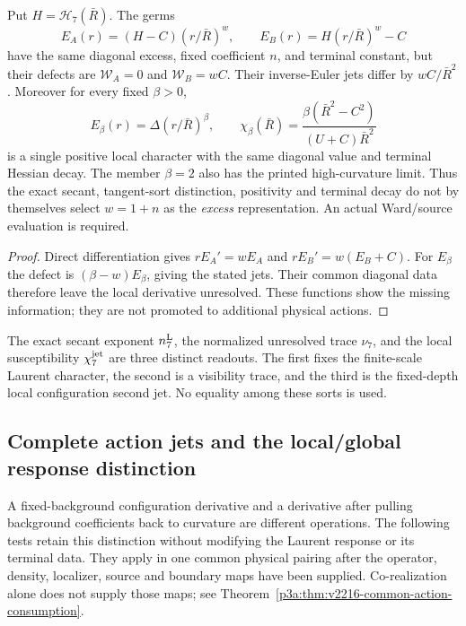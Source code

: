 \documentclass[12pt,a4paper]{article}
\begin{document}
\begin{proposition}
\label{p3d:prop:v2211-excess-jet-counterfamily}
Put $H=\mathscr H_7(\bar R)$. The germs
\[
 E_A(r)=(H-C)(r/\bar R)^w,\qquad
 E_B(r)=H(r/\bar R)^w-C
\]
have the same diagonal excess, fixed coefficient $n$, and terminal constant,
but their defects are $\mathcal W_A=0$ and $\mathcal W_B=wC$.
Their inverse-Euler jets differ by $wC/\bar R^2$.
Moreover for every fixed $\beta>0$,
\[
 E_\beta(r)=\Delta(r/\bar R)^\beta,\qquad
 \chi_\beta(\bar R)=\frac{\beta(\bar R^2-C^2)}{(U+C)\bar R^2}
\]
is a single positive local character with the same diagonal value and
terminal Hessian decay. The member $\beta=2$ also has the printed
high-curvature limit. Thus the exact secant, tangent-sort distinction,
positivity and terminal decay do not by themselves select $w=1+n$ as the
\emph{excess} representation. An actual Ward/source evaluation is required.
\end{proposition}
\begin{proof}
Direct differentiation gives $rE_A'=wE_A$ and
$rE_B'=w(E_B+C)$. For $E_\beta$ the defect is
$(\beta-w)E_\beta$, giving the stated jets. Their common diagonal data
therefore leave the local derivative unresolved. These functions show the
missing information; they are not promoted to additional physical actions.
\end{proof}

\begin{remark}
\label{p3d:rem:v173-three-n7-sorts}
The exact secant exponent $n_7^{\rm L}$, the normalized unresolved trace
$\nu_7$, and the local susceptibility $\chi_7^{\rm jet}$ are three distinct
readouts.  The first fixes the finite-scale Laurent character, the second is
a visibility trace, and the third is the fixed-depth local configuration
second jet.  No equality among these sorts is used.
\end{remark}

\subsection{Complete action jets and the local/global response distinction}
\label{p3d:sec:v2216-complete-action-jets}

A fixed-background configuration derivative and a derivative after pulling
background coefficients back to curvature are different operations. The
following tests retain this distinction without modifying the Laurent
response or its terminal data. They apply in one common physical pairing
after the operator, density, localizer, source and boundary maps have been
supplied. Co-realization alone does not supply those maps; see
Theorem~\ref{p3a:thm:v2216-common-action-consumption}.
\end{document}

